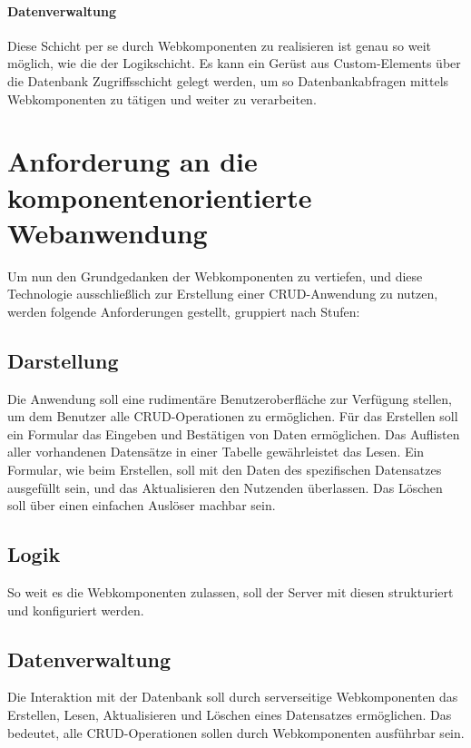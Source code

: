 \paragraph{Datenverwaltung}Diese Schicht per se durch Webkomponenten zu realisieren ist genau so weit möglich, wie die der Logikschicht. Es kann ein Gerüst aus Custom-Elements über die Datenbank Zugriffsschicht gelegt werden, um so Datenbankabfragen mittels Webkomponenten zu tätigen und weiter zu verarbeiten. 


\section{Anforderung an die komponentenorientierte Webanwendung}
Um nun den Grundgedanken der Webkomponenten zu vertiefen, und diese Technologie ausschließlich zur Erstellung einer CRUD-Anwendung zu nutzen, werden folgende Anforderungen gestellt, gruppiert nach Stufen:

\subsection{Darstellung}
Die Anwendung soll eine rudimentäre Benutzeroberfläche zur Verfügung stellen, um dem Benutzer alle CRUD-Operationen zu ermöglichen. 
Für das Erstellen soll ein Formular das Eingeben und Bestätigen von Daten ermöglichen.
Das Auflisten aller vorhandenen Datensätze in einer Tabelle gewährleistet das Lesen.
Ein Formular, wie beim Erstellen, soll mit den Daten des spezifischen Datensatzes ausgefüllt sein, und das Aktualisieren den Nutzenden überlassen.
Das Löschen soll über einen einfachen Auslöser machbar sein.
\subsection{Logik}
So weit es die Webkomponenten zulassen, soll der Server mit diesen strukturiert und konfiguriert werden.

\subsection{Datenverwaltung}
Die Interaktion mit der Datenbank soll durch serverseitige Webkomponenten das Erstellen, Lesen, Aktualisieren und Löschen eines Datensatzes ermöglichen. Das bedeutet, alle CRUD-Operationen sollen durch Webkomponenten ausführbar sein. 

